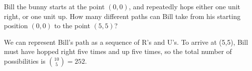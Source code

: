 \begin{example}
Bill the bunny starts at the point $(0,0)$, and repeatedly hops either one unit right, or one unit up. How many different paths can Bill take from his starting position $(0,0)$ to the point $(5,5)$?

We can represent Bill's path as a sequence of R's and U's. To arrive at (5,5), Bill must have hopped right five times and up five times, so the total number of possibilities is $\binom{10}{5} = 252$.
\end{example}


